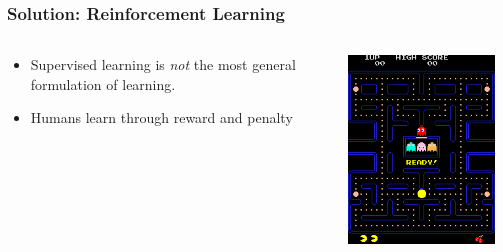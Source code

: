 \begin{frame}
  \frametitle{Solution: Reinforcement Learning}
  \begin{columns}
    \begin{column}{0.5\textwidth}
      \begin{itemize}
        \item<1-> Supervised learning is \emph{not} the most general formulation of learning.
        \item<2-> Humans learn through reward and penalty
      \end{itemize}
    \end{column}
    \begin{column}{0.5\textwidth}
    \includegraphics[width=0.9\textwidth]{Pac-man.png}
    \end{column}
  \end{columns}
\end{frame}


